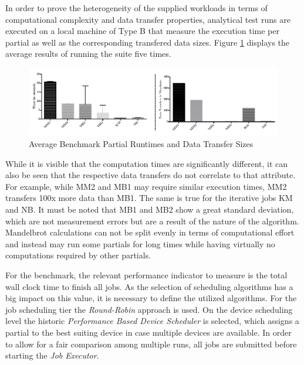 In order to prove the heterogeneity of the supplied workloads in terms of computational complexity and data transfer properties, analytical test runs are executed on a local machine of Type B that measure the execution time per partial as well as the corresponding transfered data sizes. Figure \ref{img:benchmark_kernel_attributes} displays the average results of running the suite five times.

\begin{figure}[H]

	\includegraphics[width=1.0\textwidth]{images/benchmark_kernel_data_transfers.pdf}
	\centering
	\caption{Average Benchmark Partial Runtimes and Data Transfer Sizes}
	\label{img:benchmark_kernel_attributes}
\end{figure}

While it is visible that the computation times are significantly different, it can also be seen that the respective data transfers do not correlate to that attribute. For example, while MM2 and MB1 may require similar execution times, MM2 transfers 100x more data than MB1. The same is true for the iterative jobs KM and NB. It must be noted that MB1 and MB2 show a great standard deviation, which are not measurement errors but are a result of the nature of the algorithm. Mandelbrot calculations can not be split evenly in terms of computational effort and instead may run some partials for long times while having virtually no computations required by other partials.

For the benchmark, the relevant performance indicator to measure is the total wall clock time to finish all jobs. As the selection of scheduling algorithms has a big impact on this value, it is necessary to define the utilized algorithms. For the job scheduling tier the \textit{Round-Robin} approach is used. On the device scheduling level the historic \textit{Performance Based Device Scheduler} is selected, which assigns a partial to the best suiting device in case multiple devices are available. In order to allow for a fair comparison among multiple runs, all jobs are submitted before starting the \textit{Job Executor}.

